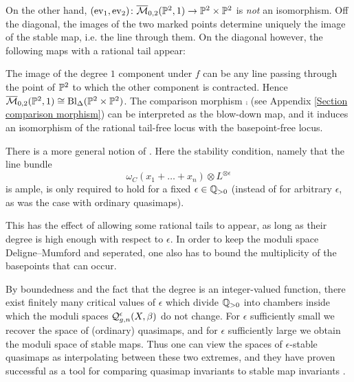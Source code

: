 \begin{example}
On the other hand, $(\operatorname{ev}_1,\operatorname{ev}_2)\colon\overline{\mathcal{M}}_{0,2}(\mathbb P^2,1)\rightarrow\mathbb P^2\times\mathbb P^2$ is \emph{not} an isomorphism. Off the diagonal, the images of the two marked points determine uniquely the image of the stable map, i.e. the line through them. On the diagonal however, the following maps with a rational tail appear:
\begin{center}
\end{center}
The image of the degree $1$ component under $f$ can be any line passing through the point of $\mathbb P^2$ to which the other component is contracted. Hence $\overline{\mathcal{M}}_{0,2}(\mathbb P^2,1)\cong\operatorname{Bl}_{\Delta}(\mathbb P^2\times\mathbb P^2)$. The comparison morphism $\comp$ (see Appendix \ref{Section comparison morphism}) can be interpreted as the blow-down map, and it induces an isomorphism of the rational tail-free locus with the basepoint-free locus.
\end{example}


\begin{remark}
 There is a more general notion of  \cite[\S 7.1]{CFKM}. Here the stability condition, namely that the line bundle
\begin{equation*} \omega_C(x_1 + \ldots + x_n)\otimes L^{\otimes \epsilon} \end{equation*} 
is ample, is only required to hold for a fixed $\epsilon \in \mathbb{Q}_{>0}$ (instead of for arbitrary $\epsilon$, as was the case with ordinary quasimaps).

This has the effect of allowing some rational tails to appear, as long as their degree is high enough with respect to $\epsilon$. In order to keep the moduli space Deligne--Mumford and seperated, one also has to bound the multiplicity of the basepoints that can occur.

By boundedness and the fact that the degree is an integer-valued function, there exist finitely many critical values of $\epsilon$ which divide $\mathbb{Q}_{>0}$ into chambers inside which the moduli spaces $\mathcal{Q}^{\epsilon}_{g,n}(X,\beta)$ do not change.
For $\epsilon$ sufficiently small we recover the space of (ordinary) quasimaps, and for $\epsilon$ sufficiently large we obtain the moduli space of stable maps. Thus one can view the spaces of $\epsilon$-stable quasimaps as interpolating between these two extremes, and they have proven  successful as a tool for comparing quasimap invariants to stable map invariants \cite{TodaStableQuotient} \cite{CF-K-wallcrossing}.
\end{remark}

